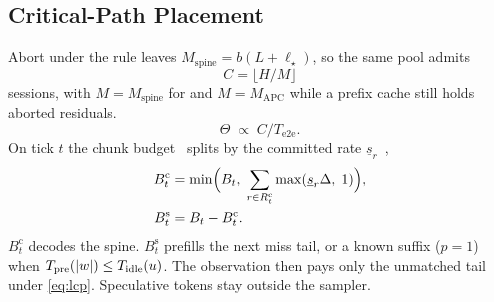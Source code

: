 \subsection{Critical-Path Placement}
\label{sec:schedule}
Abort under the rule leaves $M_{\mathrm{spine}}=b(L+\ell_\star)$, so the same pool admits
\begin{equation}
\label{eq:slots}
C=\bigl\lfloor H/M\bigr\rfloor
\end{equation}
sessions, with $M=M_{\mathrm{spine}}$ for \sys and $M=M_{\mathrm{APC}}$ while a prefix cache still holds aborted residuals.
\begin{equation}
\label{eq:theta}
\Theta\;\propto\; C/T_{\mathrm{e2e}}.
\end{equation}
On tick $t$ the chunk budget~\cite{sarathi} splits by the committed rate $\underline{s}_r$~\cite{jitserve},
\begin{align}
B^{\mathrm{c}}_t &= \min\Bigl(B_t,\; \sum_{r\in R^{\mathrm{c}}_t}\max(\underline{s}_r\Delta,\;1)\Bigr), \label{eq:bc}\\
B^{\mathrm{s}}_t &= B_t-B^{\mathrm{c}}_t. \label{eq:bs}
\end{align}
$B^{\mathrm{c}}_t$ decodes the spine.
$B^{\mathrm{s}}_t$ prefills the next miss tail, or a known suffix ($p{=}1$) when $T_{\mathrm{pre}}(|w|)\le T_{\mathrm{idle}}(u)$.
The observation then pays only the unmatched tail under \eqref{eq:lcp}.
Speculative tokens stay outside the sampler.
